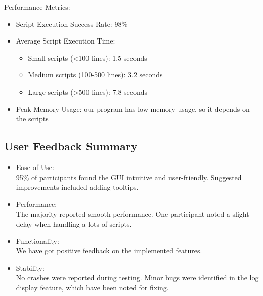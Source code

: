 \documentclass{article}
\begin{document}
\noindent Performance Metrics:
\begin{itemize}
    \item Script Execution Success Rate: 98\%
    \item Average Script Execution Time:
    \begin{itemize}
        \item Small scripts (<100 lines): 1.5 seconds
        \item Medium scripts (100-500 lines): 3.2 seconds
        \item Large scripts (>500 lines): 7.8 seconds
    \end{itemize}
    \item Peak Memory Usage: our program has low memory usage, so it depends on the scripts
\end{itemize}


\subsection{User Feedback Summary}
\begin{itemize}
    \item Ease of Use:\\
    95\% of participants found the GUI intuitive and user-friendly. Suggested improvements included adding tooltips.
    \item Performance:\\
    The majority reported smooth performance. One participant noted a slight delay when handling a lots of scripts.
    \item Functionality:\\
    We have got positive feedback on the implemented features.
    \item Stability:\\
    No crashes were reported during testing. Minor bugs were identified in the log display feature, which have been noted for fixing.
\end{itemize}
\end{document}
